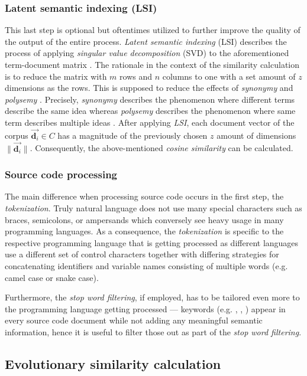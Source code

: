 \documentclass[12pt,a4paper]{report}
\begin{document}
\subsubsection{Latent semantic indexing (LSI)}
This last step is optional but oftentimes utilized to further improve the quality
of the output of the entire process. \textit{Latent semantic indexing} (LSI) describes
the process of applying \textit{singular value decomposition} (SVD) to
the aforementioned term-document matrix \cite{deerwester1990lsi}.
The rationale in the context of the similarity calculation is
to reduce the matrix with \(m\) rows and \(n\) columns to one with a
set amount of \(z\) dimensions as the rows.
This is supposed to reduce the effects of \textit{synonymy} and
\textit{polysemy} \cite{deerwester1990lsi}.
Precisely, \textit{synonymy} describes the phenomenon where different terms describe
the same idea \cite{press2011oxford} whereas \textit{polysemy} describes the phenomenon
where same term describes multiple ideas \cite{press2011oxford}.
After applying \textit{LSI}, each document vector of the corpus \(\vec{\mathbf d_i} \in C\)
has a magnitude of the previously chosen \(z\) amount of dimensions \(\|\vec{\mathbf d_i}\|\).
Consequently, the above-mentioned \textit{cosine similarity} can be calculated.


\subsubsection{Source code processing}
The main difference when processing source code occurs in the first step,
the \textit{tokenization}.
Truly natural language does not use many special characters such as
braces, semicolons, or ampersands which conversely see heavy usage in
many programming languages.
As a consequence, the \textit{tokenization} is specific to the respective
programming language that is getting processed as different languages use a
different set of control characters together with differing strategies
for concatenating identifiers and variable names consisting of
multiple words (e.g. camel case or snake case).

Furthermore, the \textit{stop word filtering}, if employed, has to be tailored
even more to the programming language getting processed ---
keywords (e.g. , , ) appear in
every source code document while not adding any meaningful semantic information,
hence it is useful to filter those out as part of the \textit{stop word filtering}.


\subsection{Evolutionary similarity calculation} \label{subsect:evolutionary-similarity}
\end{document}
